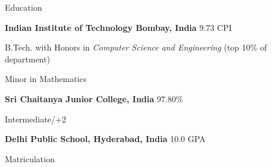 
\begin{rubric}{Education}

\entry*[2019 -- Present]%
	\textbf{Indian Institute of Technology Bombay, India} \hfill 9.73 CPI
	\par B.Tech. with Honors in \emph{Computer Science and Engineering} \hfill (top 10\% of department)
	\par Minor in Mathematics


\entry*[2017 -- 2019]%
	\textbf{Sri Chaitanya Junior College, India} \hfill 97.80\% \par
	Intermediate/+2
	

\entry*[2010 -- 2017]%
	\textbf{Delhi Public School, Hyderabad, India} \hfill 10.0 GPA \par
	Matriculation
\end{rubric}